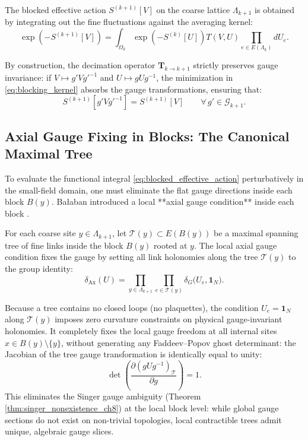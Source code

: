 The blocked effective action $S^{(k+1)}[V]$ on the coarse lattice $\Lambda_{k+1}$ is obtained by integrating out the fine fluctuations against the averaging kernel:
\begin{equation}
\label{eq:blocked_effective_action}
\exp\left( -S^{(k+1)}[V] \right) = \int_{\Omega_k} \exp\left( -S^{(k)}[U] \right) T(V, U) \prod_{e \in E(\Lambda_k)} dU_e.
\end{equation}

By construction, the decimation operator $\mathbf{T}_{k \to k+1}$ strictly preserves gauge invariance: if $V \mapsto g' V g'^{-1}$ and $U \mapsto g U g^{-1}$, the minimization in \eqref{eq:blocking_kernel} absorbs the gauge transformations, ensuring that:
\begin{equation}
S^{(k+1)}[g' V g'^{-1}] = S^{(k+1)}[V] \qquad \forall \, g' \in \mathcal{G}_{k+1}.
\end{equation}

\subsection{Axial Gauge Fixing in Blocks: The Canonical Maximal Tree}
\label{subsec:axial_gauge_tree}

To evaluate the functional integral \eqref{eq:blocked_effective_action} perturbatively in the small-field domain, one must eliminate the flat gauge directions inside each block $B(y)$. Ba\l aban introduced a local **axial gauge condition** inside each block \cite{Balaban1984,Balaban1985b}.

For each coarse site $y \in \Lambda_{k+1}$, let $\mathcal{T}(y) \subset E(B(y))$ be a maximal spanning tree of fine links inside the block $B(y)$ rooted at $y$. The local axial gauge condition fixes the gauge by setting all link holonomies along the tree $\mathcal{T}(y)$ to the group identity:
\begin{equation}
\label{eq:ch12_axial_gauge_def}
\delta_{\mathrm{Ax}}(U) = \prod_{y \in \Lambda_{k+1}} \prod_{e \in \mathcal{T}(y)} \delta_G\bigl( U_e, \mathbf{1}_N \bigr).
\end{equation}

Because a tree contains no closed loops (no plaquettes), the condition $U_e = \mathbf{1}_N$ along $\mathcal{T}(y)$ imposes zero curvature constraints on physical gauge-invariant holonomies. It completely fixes the local gauge freedom at all internal sites $x \in B(y) \setminus \{y\}$, without generating any Faddeev--Popov ghost determinant: the Jacobian of the tree gauge transformation is identically equal to unity:
\begin{equation}
\label{eq:ch12_ghost_jacobian_unity}
\det\left( \frac{\partial (g U g^{-1})_{\mathcal{T}}}{\partial g} \right) = 1.
\end{equation}
This eliminates the Singer gauge ambiguity (Theorem \ref{thm:singer_nonexistence_ch8}) at the local block level: while global gauge sections do not exist on non-trivial topologies, local contractible trees admit unique, algebraic gauge slices.

